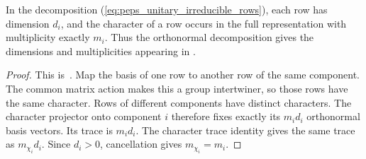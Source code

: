 \begin{lemma}
    \label{thm:peps_unitary_character_blocks}
    \leanok
    In the decomposition (\ref{eq:peps_unitary_irreducible_rows}), each
    row has dimension $d_i$, and the character of a row occurs in the
    full representation with multiplicity exactly $m_i$.
    Thus the orthonormal decomposition gives the dimensions and
    multiplicities appearing in \cite[Lemma~4.4]{Schuch2010PEPS}.
\end{lemma}
\begin{proof}\leanok
    This is~\cite[``Character multiplicities of orthonormal
        rows'']{QICLean2026Blueprint}.
    Map the basis of one row to another row of the same component.
    The common matrix action makes this a group intertwiner, so those
    rows have the same character. Rows of different components have
    distinct characters. The character projector onto component $i$
    therefore fixes exactly its $m_id_i$ orthonormal basis vectors.
    Its trace is $m_id_i$. The character trace identity gives the same
    trace as $m_{\chi_i}d_i$. Since $d_i>0$, cancellation gives
    $m_{\chi_i}=m_i$.
\end{proof}
